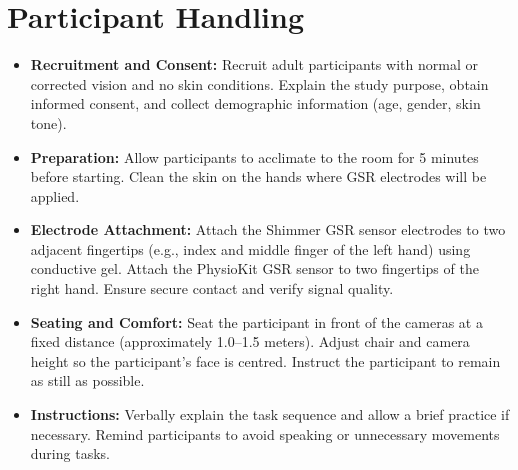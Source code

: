 \documentclass{article}
\begin{document}

\section{Participant Handling}
\begin{itemize}
    \item \textbf{Recruitment and Consent:} Recruit adult participants with normal or corrected vision and no skin conditions. Explain the study purpose, obtain informed consent, and collect demographic information (age, gender, skin tone).
    \item \textbf{Preparation:} Allow participants to acclimate to the room for 5 minutes before starting. Clean the skin on the hands where GSR electrodes will be applied.
    \item \textbf{Electrode Attachment:} Attach the Shimmer GSR sensor electrodes to two adjacent fingertips (e.g., index and middle finger of the left hand) using conductive gel. Attach the PhysioKit GSR sensor to two fingertips of the right hand. Ensure secure contact and verify signal quality.
    \item \textbf{Seating and Comfort:} Seat the participant in front of the cameras at a fixed distance (approximately 1.0–1.5 meters). Adjust chair and camera height so the participant’s face is centred. Instruct the participant to remain as still as possible.
    \item \textbf{Instructions:} Verbally explain the task sequence and allow a brief practice if necessary. Remind participants to avoid speaking or unnecessary movements during tasks.
\end{itemize}
\end{document}
